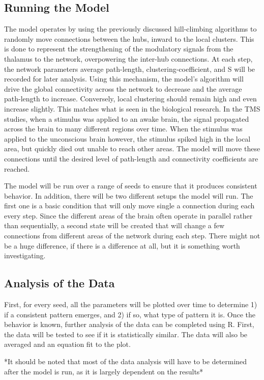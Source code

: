 \documentclass[11pt,letterpaper,doublespacing,titlepage]{article}
\begin{document}
\subsection{Running the Model}
\par
The model operates by using the previously discussed hill-climbing algorithms to randomly move connections between the hubs, inward to the local clusters. This is done to represent the strengthening of the modulatory signals from the thalamus to the network, overpowering the inter-hub connections.  At each step, the network parameters average path-length, clustering-coefficient, and S will be recorded for later analysis. Using this mechanism, the model's algorithm will drive the global connectivity across the network to decrease and the average path-length to increase. Conversely, local clustering should remain high and even increase slightly. This matches what is seen in the biological research. In the TMS studies, when a stimulus was applied to an awake brain, the signal propagated across the brain to many different regions over time. When the stimulus was applied to the unconscious brain however, the stimulus spiked high in the local area, but quickly died out unable to reach other areas. The model will move these connections until the desired level of path-length and connectivity coefficients are reached. 
\par
The model will be run over a range of seeds to ensure that it produces consistent behavior. In addition, there will be two different setups the model will run. The first one is a basic condition that will only move single a connection during each every step. Since the different areas of the brain often operate in parallel rather than sequentially, a second state will be created that will change a few connections from different areas of the network during each step. There might not be a huge difference, if there is a difference at all, but it is something worth investigating.
\subsection{Analysis of the Data}
\par
First, for every seed, all the parameters will be plotted over time to determine 1) if a  consistent pattern emerges, and 2) if so, what type of pattern it is. Once the behavior is known, further analysis of the data can be completed using R. First, the data will be tested to see if it is statistically similar. The data will also be averaged and an equation fit to the plot. 
\par
*It should be noted that most of the data analysis will have to be determined after the model is run, as it is largely dependent on the  results*
\end{document}
